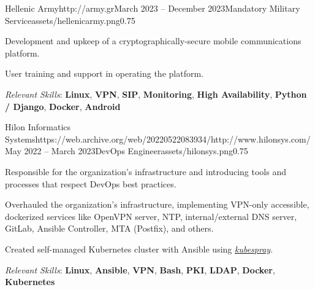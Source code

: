 \documentclass{mycv}
\begin{document}
	\vspace{0.5cm}

	\begin{EntryDatedLogo}{Hellenic Army}{http://army.gr}{March 2023 -- December 2023}{Mandatory Military Service}{assets/hellenicarmy.png}{0.75}
		\begin{Itemize}
			\item Development and upkeep of a cryptographically-secure mobile communications platform.
			\item User training and support in operating the platform.
			\item \textit{Relevant Skills}: \textbf{Linux}, \textbf{VPN}, \textbf{SIP}, \textbf{Monitoring}, \textbf{High Availability}, \textbf{Python / Django}, \textbf{Docker}, \textbf{Android}
		\end{Itemize}
	\end{EntryDatedLogo}

	\vspace{0.5cm}

	\begin{EntryDatedLogo}{Hilon Informatics Systems}{https://web.archive.org/web/20220522083934/http://www.hilonsys.com/}{May 2022 -- March 2023}{DevOps Engineer}{assets/hilonsys.png}{0.75}
		\begin{Itemize}
			\item Responsible for the organization's infrastructure and introducing tools and processes that respect DevOps best practices.
			\item Overhauled the organization's infrastructure, implementing VPN-only accessible, dockerized services like OpenVPN server, NTP, internal/external DNS server, GitLab, Ansible Controller, MTA (Postfix), and others.
			\item Created self-managed Kubernetes cluster with Ansible using \href{https://kubespray.io/}{\textit{kubespray}}.
			\item \textit{Relevant Skills}: \textbf{Linux}, \textbf{Ansible}, \textbf{VPN}, \textbf{Bash}, \textbf{PKI}, \textbf{LDAP}, \textbf{Docker}, \textbf{Kubernetes}
		\end{Itemize}
	\end{EntryDatedLogo}

	\vspace{0.5cm}
\end{document}

